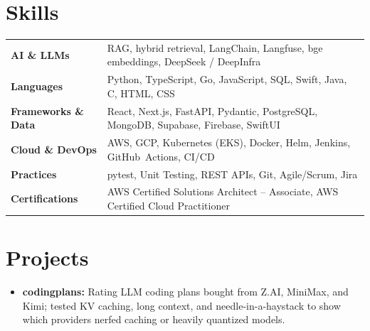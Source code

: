 \documentclass[11pt, letterpaper]{article}
\begin{document}
\section{Skills}
\begin{tabularx}{\textwidth}{@{}l @{\hspace{7pt}} >{\raggedright\arraybackslash}X@{}}
  \textbf{AI \& LLMs} & RAG, hybrid retrieval, LangChain, Langfuse, bge embeddings, DeepSeek / DeepInfra \\[1pt]
  \textbf{Languages} & Python, TypeScript, Go, JavaScript, SQL, Swift, Java, C, HTML, CSS \\[1pt]
  \textbf{Frameworks \& Data} & React, Next.js, FastAPI, Pydantic, PostgreSQL, MongoDB, Supabase, Firebase, SwiftUI \\[1pt]
  \textbf{Cloud \& DevOps} & AWS, GCP, Kubernetes (EKS), Docker, Helm, Jenkins, GitHub~Actions, CI/CD \\[1pt]
  \textbf{Practices} & pytest, Unit Testing, REST APIs, Git, Agile/Scrum, Jira \\[1pt]
  \textbf{Certifications} & AWS Certified Solutions Architect -- Associate, AWS Certified Cloud Practitioner \\
\end{tabularx}

\section{Projects}
\begin{itemize}
  \item \textbf{codingplans:} Rating LLM coding plans bought from Z.AI, MiniMax, and Kimi; tested KV caching, long context, and needle-in-a-haystack to show which providers nerfed caching or heavily quantized models.
\end{itemize}
\end{document}
